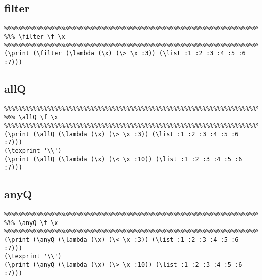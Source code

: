 \documentclass[10pt,a4paper]{article}
\begin{document}
\begin{framed}
\noindent
{}
\end{framed}

\subsection{filter}
\begin{verbatim}
%%%%%%%%%%%%%%%%%%%%%%%%%%%%%%%%%%%%%%%%%%%%%%%%%%%%%%%%%%%%%%%%%%%%%%%%%%%%%
%%% \filter \f \x 
%%%%%%%%%%%%%%%%%%%%%%%%%%%%%%%%%%%%%%%%%%%%%%%%%%%%%%%%%%%%%%%%%%%%%%%%%%%%%
(\print (\filter (\lambda (\x) (\> \x :3)) (\list :1 :2 :3 :4 :5 :6 :7)))
\end{verbatim}

\begin{framed}
\noindent
{}
\end{framed}


\subsection{allQ}
\begin{verbatim}
%%%%%%%%%%%%%%%%%%%%%%%%%%%%%%%%%%%%%%%%%%%%%%%%%%%%%%%%%%%%%%%%%%%%%%%%%%%%%
%%% \allQ \f \x 
%%%%%%%%%%%%%%%%%%%%%%%%%%%%%%%%%%%%%%%%%%%%%%%%%%%%%%%%%%%%%%%%%%%%%%%%%%%%%
(\print (\allQ (\lambda (\x) (\> \x :3)) (\list :1 :2 :3 :4 :5 :6 :7)))
(\texprint '\\')
(\print (\allQ (\lambda (\x) (\< \x :10)) (\list :1 :2 :3 :4 :5 :6 :7)))
\end{verbatim}

\begin{framed}
\noindent
{}
\end{framed}


\subsection{anyQ}
\begin{verbatim}
%%%%%%%%%%%%%%%%%%%%%%%%%%%%%%%%%%%%%%%%%%%%%%%%%%%%%%%%%%%%%%%%%%%%%%%%%%%%%
%%% \anyQ \f \x 
%%%%%%%%%%%%%%%%%%%%%%%%%%%%%%%%%%%%%%%%%%%%%%%%%%%%%%%%%%%%%%%%%%%%%%%%%%%%%
(\print (\anyQ (\lambda (\x) (\< \x :3)) (\list :1 :2 :3 :4 :5 :6 :7)))
(\texprint '\\')
(\print (\anyQ (\lambda (\x) (\> \x :10)) (\list :1 :2 :3 :4 :5 :6 :7)))
\end{verbatim}
\end{document}
